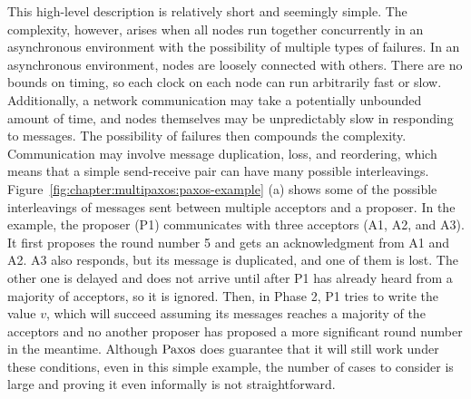 This high-level description is relatively short and seemingly simple.
The complexity, however, arises when all nodes run together concurrently in an asynchronous environment with the possibility of multiple types of failures.
In an asynchronous environment, nodes are loosely connected with others.
There are no bounds on timing, so each clock on each node can run arbitrarily fast or slow.
Additionally, a network communication may take a potentially unbounded amount of time,
and nodes themselves may be unpredictably slow in responding to messages.
The possibility of failures then compounds the complexity.
Communication may involve message duplication, loss, and reordering, which means that a simple send-receive pair can have many possible interleavings.
Figure~\ref{fig:chapter:multipaxos:paxos-example} (a) shows some of the possible interleavings of messages sent between multiple acceptors and a proposer.
In the example, the proposer (P1) communicates with three acceptors (A1, A2, and A3).
It first proposes the round number 5 and gets an acknowledgment from A1 and A2.
A3 also responds, but its message is duplicated, and one of them is lost.
The other one is delayed and does not arrive until after P1 has already heard from a majority of acceptors, so it is ignored.
Then, in Phase 2, P1 tries to write the value $v$, which will succeed assuming its messages reaches a majority of the acceptors and no
another proposer has proposed a more significant round number in the meantime.
Although $\mathrm{Paxos}$ does guarantee that it will still work under these conditions, even in this simple example,
the number of cases to consider is large and proving it even informally is not straightforward.

